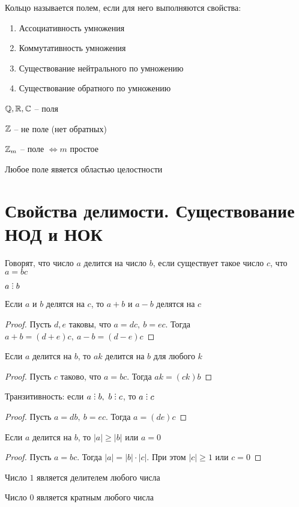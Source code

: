 \begin{definition}
	Кольцо называется полем, если для него выполняются свойства:
	\begin{enumerate}
		\item Ассоциативность умножения
		\item Коммутативность умножения
		\item Существование нейтрального по умножению
		\item Существование обратного по умножению
	\end{enumerate}
\end{definition}

\begin{exmpls}
	\item $\mathbb{Q}, \mathbb{R}, \mathbb{C}$ -- поля
	\item $\mathbb{Z}$ -- не поле (нет обратных)
	\item $\mathbb{Z}_m$ -- поле $ \iff m $ простое
\end{exmpls}

\begin{note}
	Любое поле явяется областью целостности
\end{note}

\section{Свойства делимости. Существование НОД и НОК}

\begin{definition}
	Говорят, что число $a$ делится на число $b$, если существует такое число $c$, что $a = bc$
	\begin{notation}
		$a \divby b$
	\end{notation}
\end{definition}

\begin{props}
	\item Если $a$ и $b$ делятся на $c$, то $a + b$ и $a - b$ делятся на $c$
	\begin{proof}
		Пусть $d, e$ таковы, что $a = dc, ~ b = ec$. Тогда $a + b = (d + e)c, ~ a - b = (d - e)c$
	\end{proof}
	\item Если $a$ делится на $b$, то $ak$ делится на $b$ для любого $k$
	\begin{proof}
		Пусть $c$ таково, что $a = bc$. Тогда $ak = (ck)b$
	\end{proof}
	\item Транзитивность: если $a \divby b, ~ b \divby c$, то $a \divby c$
	\begin{proof}
		Пусть $a = db, ~ b = ec$. Тогда $a = (de)c$
	\end{proof}
	\item Если $a$ делится на $b$, то $|a| \ge |b|$ или $a = 0$
	\begin{proof}
		Пусть $a = bc$. Тогда $|a| = |b| \cdot |c|$. При этом $|c| \ge 1$ или $c = 0$
	\end{proof}
	\item Число $1$ является делителем любого числа
	\item Число $0$ является кратным любого числа
\end{props}

